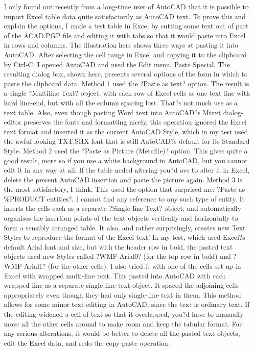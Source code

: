 \documentclass[a4paper]{article}
\begin{document}
{I only found out recently from a long-time user of AutoCAD that it is possible to import Excel table data quite satisfactorily as AutoCAD text. To prove this and explain the options, I made a test table in Excel by cutting some text out of part of the ACAD.PGP file and editing it with tabs so that it would paste into Excel in rows and columns. The illustration here shows three ways at pasting it into AutoCAD. After selecting the cell range in Excel and copying it to the clipboard by Ctrl-C, I opened AutoCAD and used the Edit menu, Paste Special. The resulting dialog box, shown here, presents several options of the form in which to paste the clipboard data.
Method 1 used the ?Paste as text? option. The result is a single ?Multiline Text? object, with each row of Excel cells as one text line with hard line-end, but with all the column spacing lost. That?s not much use as a text table. Also, even though pasting Word text into AutoCAD?s Mtext dialog-editor preserves the fonts and formatting nicely, this operation ignored the Excel text format and inserted it as the current AutoCAD Style, which in my test used the awful-looking TXT.SHX font that is still AutoCAD?s default for its Standard Style.
Method 2 used the ?Paste as Picture (Metafile)? option. This gives quite a good result, more so if you use a white background in AutoCAD, but you cannot edit it in any way at all. If the table neded altering you?d ave to alter it in Excel, delete the present AutoCAD insertion and paste the picture again.
Method 3 is the most satisfactory, I think. This used the option that surprised me: ?Paste as \%PRODUCT entities?. I cannot find any reference to any such type of entity. It inserts the cells each as a separate ?Single-line Text? object, and automatically organises the insertion points of the text objects vertically and horizontally to form a sensibly arranged table. It also, and rather surprisingly, creates new Text Styles to reproduce the format of the Excel text! In my test, which used Excel?s default Arial font and size, but with the header row in bold, the pasted text objects used new Styles called ?WMF-Arial0? (for the top row in bold) and ?WMF-Arial1? (for the other cells).
I also tried it with one of the cells set up in Excel with wrapped multi-line text. This pasted into AutoCAD with each wrapped line as a separate single-line text object. It spaced the adjoining cells appropriately even though they had only single-line text in them.
This method allows for some minor text editing in AutoCAD, since the text is ordinary text. If the editing widened a cell of text so that it overlapped, you?d have to manually move all the other cells around to make room and keep the tabular format. For any serious alterations, it would be better to delete all the pasted text objects, edit the Excel data, and redo the copy-paste operation.
}
\end{document}

